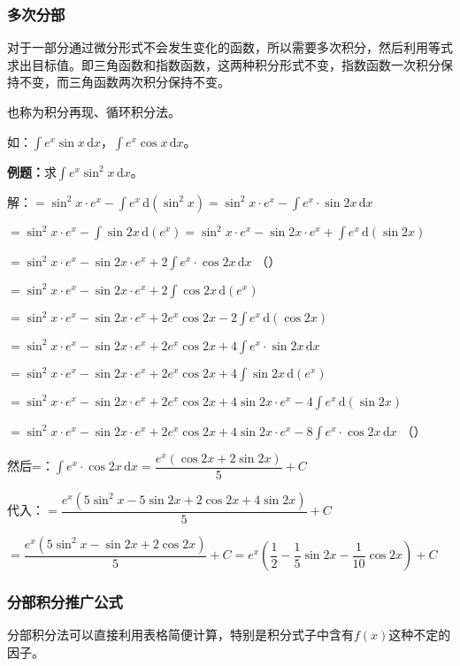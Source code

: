 \documentclass[UTF8, 12pt]{ctexart}
\begin{document}
\subsubsection{多次分部}

对于一部分通过微分形式不会发生变化的函数，所以需要多次积分，然后利用等式求出目标值。即三角函数和指数函数，这两种积分形式不变，指数函数一次积分保持不变，而三角函数两次积分保持不变。

也称为积分再现、循环积分法。

如：$\int e^x\sin x\,\textrm{d}x$，$\int e^x\cos x\,\textrm{d}x$。

\textbf{例题：}求$\int e^x\sin^2x\,\textrm{d}x$。

解：$=\sin^2x\cdot e^x-\int e^x\,\textrm{d}(\sin^2x)=\sin^2x\cdot e^x-\int e^x\cdot\sin 2x\,\textrm{d}x$

$=\sin^2x\cdot e^x-\int\sin2x\,\textrm{d}(e^x)=\sin^2x\cdot e^x-\sin2x\cdot e^x+\int e^x\,\textrm{d}(\sin2x)$

$=\sin^2x\cdot e^x-\sin2x\cdot e^x+2\int e^x\cdot\cos2x\,\textrm{d}x$ （）

$=\sin^2x\cdot e^x-\sin2x\cdot e^x+2\int\cos2x\,\textrm{d}(e^x)$

$=\sin^2x\cdot e^x-\sin2x\cdot e^x+2e^x\cos2x-2\int e^x\,\textrm{d}(\cos2x)$

$=\sin^2x\cdot e^x-\sin2x\cdot e^x+2e^x\cos2x+4\int e^x\cdot\sin2x\,\textrm{d}x$

$=\sin^2x\cdot e^x-\sin2x\cdot e^x+2e^x\cos2x+4\int\sin2x\,\textrm{d}(e^x)$

$=\sin^2x\cdot e^x-\sin2x\cdot e^x+2e^x\cos2x+4\sin2x\cdot e^x-4\int e^x\,\textrm{d}(\sin2x)$

$=\sin^2x\cdot e^x-\sin2x\cdot e^x+2e^x\cos2x+4\sin2x\cdot e^x-8\int e^x\cdot\cos2x\,\textrm{d}x$ （）

然后=：$\int e^x\cdot\cos2x\,\textrm{d}x=\dfrac{e^x(\cos2x+2\sin2x)}{5}+C$

代入：$=\dfrac{e^x(5\sin^2x-5\sin2x+2\cos2x+4\sin2x)}{5}+C$

$=\dfrac{e^x(5\sin^2x-\sin2x+2\cos2x)}{5}+C=e^x\left(\dfrac{1}{2}-\dfrac{1}{5}\sin2x-\dfrac{1}{10}\cos2x\right)+C$

\subsubsection{分部积分推广公式}

分部积分法可以直接利用表格简便计算，特别是积分式子中含有$f(x)$这种不定的因子。
\end{document}
